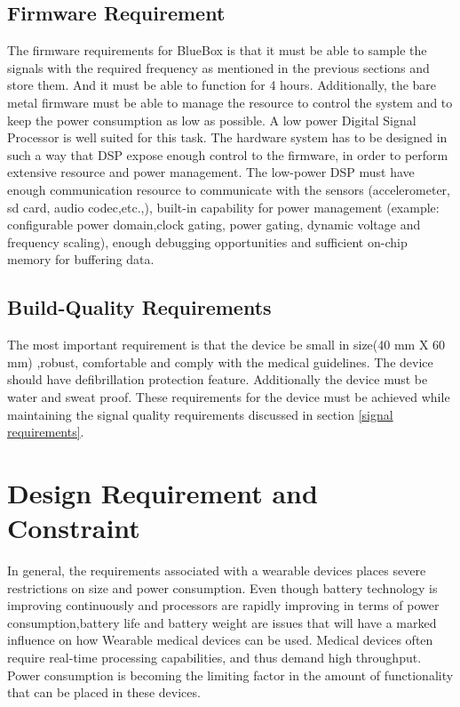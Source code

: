\subsection{Firmware Requirement }
The firmware requirements for BlueBox  is that it must be able to sample the signals with the required frequency as mentioned in the previous sections and store them. And it must be able to function for 4 hours. Additionally, the bare metal firmware must be able to manage the resource to control the system and to keep the power consumption as low as possible. A low power Digital Signal Processor is well suited for this task. The hardware system has to be designed in such a way that DSP  expose enough control to the firmware, in order to perform extensive resource and power management. The low-power DSP must have enough communication resource to communicate with the sensors (accelerometer, sd card, audio codec,etc.,), built-in capability for power management (example: configurable power domain,clock gating, power gating, dynamic voltage and frequency scaling), enough debugging opportunities and sufficient on-chip memory for buffering data. 

\subsection {Build-Quality Requirements} 
The most important requirement is that the device be small in size(40 mm X 60 mm) ,robust, comfortable and comply with the medical guidelines. The device should have defibrillation protection feature. Additionally the device must be water and sweat proof. These requirements for the device must be achieved while maintaining the signal quality requirements discussed in section \ref{signal requirements}.  

\section {Design Requirement and Constraint} 
In general, the requirements associated with a wearable devices places severe restrictions on size and power consumption. Even though battery technology is improving continuously and processors are rapidly improving in terms of power consumption,battery life and battery weight are issues that will have a marked influence on how  Wearable medical devices can be used. Medical devices often require real-time processing capabilities, and thus demand high throughput. Power consumption is becoming the limiting factor in the amount of functionality that can be placed in these devices. 

